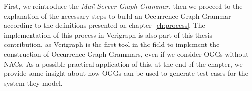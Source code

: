 First, we reintroduce the \emph{Mail Server Graph Grammar}, then we proceed to the explanation of the necessary steps to build an Occurrence Graph Grammar according to the definitions presented on chapter~\ref{ch:process}. The implementation of this process in Verigraph is also part of this thesis contribution, as Verigraph is the first tool in the field to implement the construction of Occurrence Graph Grammars, even if we consider OGGs without NACs. As a possible practical application of this, at the end of the chapter, we provide some insight about how OGGs can be used to generate test cases for the system they model.




